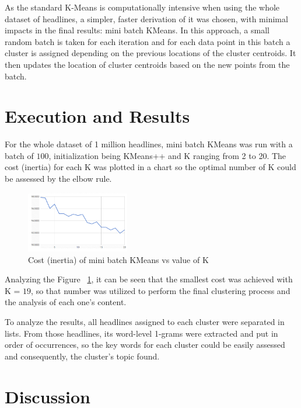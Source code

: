 \documentclass[10pt,twocolumn,letterpaper]{article}
\begin{document}
As the standard K-Means is computationally intensive when using the whole dataset of headlines,  a simpler, faster derivation of it was chosen, with minimal impacts in the final results: mini batch KMeans. In this approach, a small random batch is taken for each iteration and for each data point in this batch a cluster is assigned  depending on the previous locations of the cluster centroids. It then updates the location of cluster centroids based on the new points from the batch. 

\section{Execution and Results}

For the whole dataset of 1 million headlines, mini batch KMeans was run with a batch of $100$, initialization being KMeans++ and K ranging from 2 to 20. The cost (inertia) for each K was plotted in a chart so the optimal number of K could be assessed by the elbow rule.

\begin{figure}[H]
\begin{center}
	\includegraphics[width=0.4\textwidth]{pics/graph_inertia_all}
	\caption{Cost (inertia) of mini batch KMeans vs value of K\label{fig:graph_inertia_all}}   
\end{center} 
\end{figure}   

Analyzing the Figure ~\ref{fig:graph_inertia_all}, it can be seen that the smallest cost was achieved with K = $19$, so that number was utilized to perform the final clustering process and the analysis of each one's content.

To analyze the results, all headlines assigned to each cluster were separated in lists. From those headlines, its word-level 1-grams were extracted and put in order of occurrences, so the key words for each cluster could be easily assessed and consequently, the cluster's topic found.



\section{Discussion}
\end{document}
